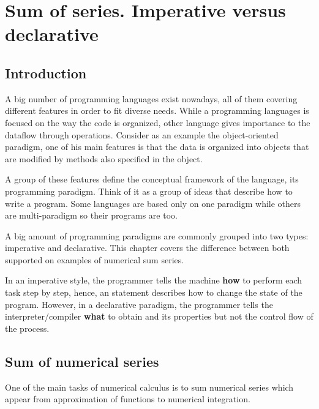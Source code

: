 
\newpage 
\chapter{Sum of series. Imperative versus declarative}   \label{chap:impdec}


\section{Introduction}
\vspace{-0.5cm}
A big number of programming languages exist nowadays, all of them covering different features 
in order to fit diverse needs. While a programming languages is focused on the way the 
code is organized, other language gives importance to the dataflow through operations.
Consider as an example the object-oriented paradigm, one of his main features 
is that the data is organized into objects 
that are modified by methods also specified in the object.

A group of these features define the conceptual framework of the language, its programming paradigm.
Think of it as a group of ideas that describe how to write a program. Some languages are based only on one 
paradigm while others are multi-paradigm so their programs are too.  

A big amount of programming paradigms are commonly grouped into two types: imperative and declarative. 
This chapter covers the difference between both supported on examples of numerical sum series.

In an imperative style, the programmer tells the machine \textbf{how} to perform each task step by step,
hence, an statement describes how to change the state of the program.
However, in a declarative paradigm, the programmer tells the interpreter/compiler \textbf{what} to obtain
and its properties but not the control flow of the process. 



\section{Sum of numerical series} 
One of the main tasks of numerical calculus is to sum numerical series
which appear from approximation of functions to numerical integration. 

